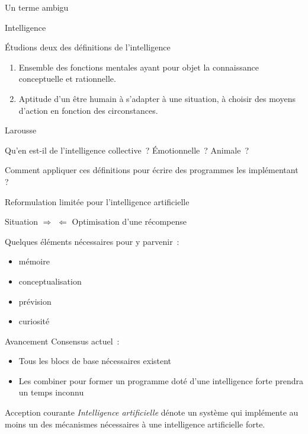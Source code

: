 \begin{frame}{Un terme ambigu}
  \begin{center}
    \huge{Intelligence}
  \end{center}
\end{frame}

\begin{frame}{Étudions deux des définitions de l'intelligence}
  \epigraph{%
    \begin{enumerate}
      \item Ensemble des fonctions mentales ayant pour objet la connaissance conceptuelle et rationnelle.
      \item Aptitude d'un être humain à s'adapter à une situation, à choisir des moyens d'action en fonction des circonstances.
    \end{enumerate}%
  }{Larousse}

  Qu'en est-il de l'intelligence collective~? Émotionnelle~? Animale~?

  Comment appliquer ces définitions pour écrire des programmes les implémentant ?
\end{frame}

\begin{frame}{Reformulation limitée pour l'intelligence artificielle}
  \begin{center}
    Situation $\Rightarrow$  $\Leftarrow$ Optimisation d'une récompense
  \end{center}

  Quelques éléments nécessaires pour y parvenir~:

  \begin{itemize}[<+->]
    \item mémoire
    \item conceptualisation
    \item prévision
    \item curiosité
  \end{itemize}
\end{frame}

\begin{frame}{Avancement}
  Consensus actuel~:

  \begin{itemize}[<+->]
    \item Tous les blocs de base nécessaires existent
    \item Les combiner pour former un programme doté d'une intelligence forte prendra un temps inconnu
  \end{itemize}
\end{frame}

\begin{frame}{Acception courante}
  \emph{Intelligence artificielle} dénote un système qui implémente au moins un des mécanismes nécessaires à une intelligence artificielle forte.
\end{frame}
